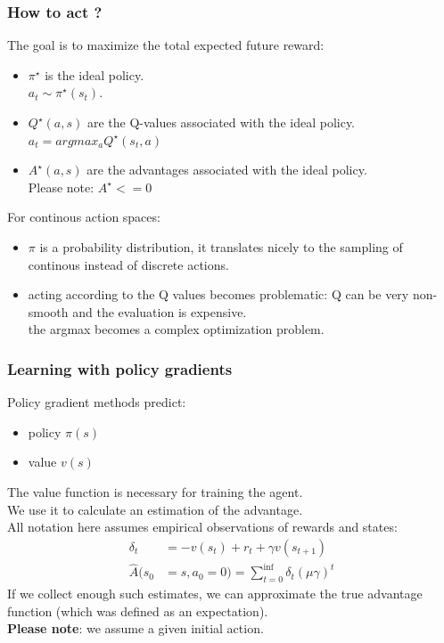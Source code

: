 \documentclass{beamer}
\begin{document}
\begin{frame}
\frametitle{How to act ?}
The goal is to maximize the total expected future reward:
\begin{itemize}
\item \(\pi^\star\) is the ideal policy. \\
\hspace{0.5cm} \textrightarrow  \hspace{0.5cm} \(a_t \sim \pi^\star(s_t)\). 
\item \(Q^\star(a, s)\) are the Q-values associated with the ideal policy.\\
\hspace{0.5cm} \textrightarrow  \hspace{0.5cm} \(a_t = argmax_a Q^\star(s_t, a)\)
\item \(A^\star(a, s)\) are the advantages associated with the ideal policy. \\
Please note: \(A^\star <= 0\)
\end{itemize}
\bigskip

For continous action spaces:
\begin{itemize}
\item \(\pi\) is a probability distribution, it translates nicely to the sampling of continous instead of discrete actions.
\item acting according to the Q values becomes problematic: Q can be very non-smooth and the evaluation is expensive.\\
\hspace{0.5cm} \textrightarrow  \hspace{0.5cm} the argmax becomes a complex optimization problem.
\end{itemize}
\end{frame}

\begin{frame}
\frametitle{Learning with policy gradients}
Policy gradient methods predict:
\begin{itemize}
\item policy \(\pi(s)\)
\item value \(v(s)\)
\end{itemize}
The value function is necessary for training the agent. \\
We use it to calculate an estimation of the advantage. \\
All notation here assumes empirical observations of rewards and states:
\begin{align*}
\delta_t &= -v(s_t) + r_t + \gamma  v(s_{t+1}) \\
\hat{A}(s_0 &=s, a_0 =0) = \sum_{t=0}^{\inf} \delta_t (\mu \gamma) ^t
\end{align*}
If we collect enough such estimates, we can approximate the true advantage function (which was defined as an expectation).\\
\textbf{Please note}: we assume a given initial action.
\end{frame}
\end{document}
